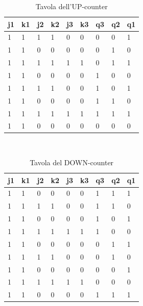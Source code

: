 \documentclass[journal, a4paper]{IEEEtran}
\begin{document}

\begin{table}
\caption{Tavola dell'UP-counter}
\centering
\begin{tabular}{l|l|l|l|l|l|l|l|l}
\hline
\textbf{j1} & \textbf{k1} & \textbf{j2} & \textbf{k2} &\textbf{ j3} & \textbf{k3} & \textbf{q3} & \textbf{q2} & \textbf{q1} \\
\hline
1 & 1 & 1 & 1 & 0 & 0 & 0 & 0 & 1 \\
1 & 1 & 0 & 0 & 0 & 0 & 0 & 1 & 0 \\
1 & 1 & 1 & 1 & 1 & 1 & 0 & 1 & 1 \\
1 & 1 & 0 & 0 & 0 & 0 & 1 & 0 & 0 \\
1 & 1 & 1 & 1 & 0 & 0 & 1 & 0 & 1 \\
1 & 1 & 0 & 0 & 0 & 0 & 1 & 1 & 0 \\
1 & 1 & 1 & 1 & 1 & 1 & 1 & 1 & 1 \\
1 & 1 & 0 & 0 & 0 & 0 & 0 & 0 & 0 \\
\hline
\end{tabular}
\end{table}
~\\

\begin{table}
\centering
\caption{Tavola del DOWN-counter}

\begin{tabular}{l|l|l|l|l|l|l|l|l}
\hline
\textbf{j1} & \textbf{k1} & \textbf{j2} & \textbf{k2} &\textbf{ j3} & \textbf{k3} & \textbf{q3} & \textbf{q2} & \textbf{q1} \\
\hline
1 & 1 & 0 & 0 & 0 & 0 & 1 & 1 & 1 \\
1 & 1 & 1 & 1 & 0 & 0 & 1 & 1 & 0 \\
1 & 1 & 0 & 0 & 0 & 0 & 1 & 0 & 1 \\
1 & 1 & 1 & 1 & 1 & 1 & 1 & 0 & 0 \\
1 & 1 & 0 & 0 & 0 & 0 & 0 & 1 & 1 \\
1 & 1 & 1 & 1 & 0 & 0 & 0 & 1 & 0 \\
1 & 1 & 0 & 0 & 0 & 0 & 0 & 0 & 1 \\
1 & 1 & 1 & 1 & 1 & 1 & 0 & 0 & 0 \\
1 & 1 & 0 & 0 & 0 & 0 & 1 & 1 & 1 \\
\hline
\end{tabular}

\end{table}
~\\
\end{document}
